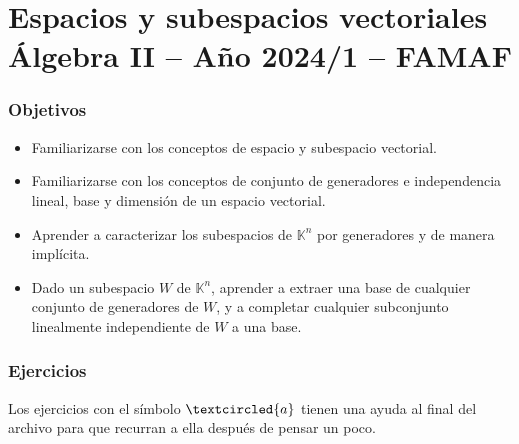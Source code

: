 \chapter{Espacios y subespacios vectoriales \\Álgebra  II -- Año 2024/1 -- FAMAF}\label{practico-6}


    

\subsection*{Objetivos}
    
\begin{itemize}
\item Familiarizarse con los conceptos de espacio y subespacio vectorial.
\item Familiarizarse con los conceptos de conjunto de generadores e independencia lineal, base y dimensión de un espacio vectorial.
        
\item Aprender a caracterizar los subespacios de $\mathbb K^n$ por generadores y de manera implícita.

\item Dado un subespacio $W$ de $\mathbb K^n$, aprender a extraer una base de cualquier conjunto de generadores de $W$, y a completar cualquier subconjunto linealmente independiente de $W$ a una base.

\end{itemize}
    
    
\subsection*{Ejercicios} Los ejercicios con el símbolo $\textcircled{a}$ tienen una ayuda al final del archivo para que recurran a ella después de pensar un poco.

